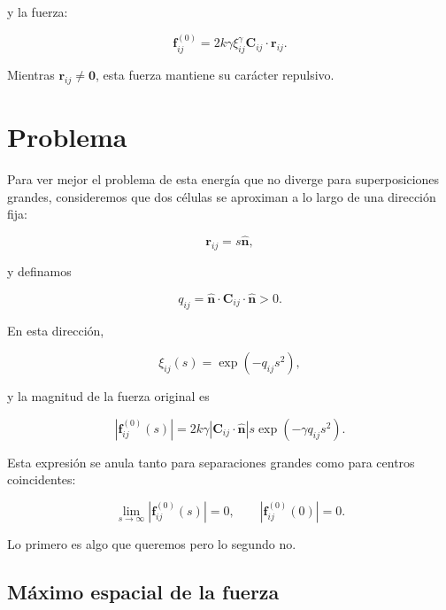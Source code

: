 \documentclass[11pt,a4paper]{article}
\begin{document}
y la fuerza:

\begin{equation}
\boxed{
\mathbf f_{ij}^{(0)}
=
2k\gamma\xi_{ij}^{\gamma}
\mathbf C_{ij}\cdot\mathbf r_{ij}
}.
\label{eq:original_force}
\end{equation}

Mientras $\mathbf r_{ij} \neq \mathbf0$, esta fuerza mantiene su carácter repulsivo.

\section{Problema}

Para ver mejor el problema de esta energía que no diverge para superposiciones grandes, consideremos que dos células se aproximan a lo largo de una dirección fija:

\begin{equation}
\mathbf r_{ij}=s\hat{\mathbf n},
\end{equation}

y definamos

\begin{equation}
q_{ij}
=
\hat{\mathbf n}\cdot
\mathbf C_{ij}\cdot
\hat{\mathbf n}
>0.
\end{equation}

En esta dirección,

\begin{equation}
\xi_{ij}(s)
=
\exp\left(-q_{ij}s^2\right),
\label{eq:superposicion_direccion}
\end{equation}

y la magnitud de la fuerza original es

\begin{equation}
\left|\mathbf f_{ij}^{(0)}(s)\right|
=
2k\gamma
\left|\mathbf C_{ij}\cdot\hat{\mathbf n}\right|
s\exp\left(-\gamma q_{ij}s^2\right).
\label{eq:original_force_ray}
\end{equation}

Esta expresión se anula tanto para separaciones grandes como para centros coincidentes:

\begin{equation}
\lim_{s\rightarrow\infty}
\left|\mathbf f_{ij}^{(0)}(s)\right|
=0,
\qquad
\left|\mathbf f_{ij}^{(0)}(0)\right|
=0.
\end{equation}

Lo primero es algo que queremos pero lo segundo no.

\subsection{Máximo espacial de la fuerza}
\end{document}
